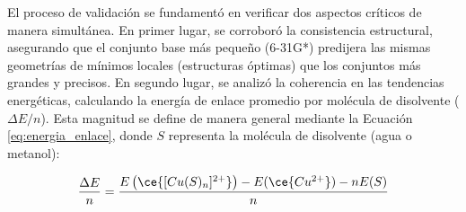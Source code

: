 El proceso de validación se fundamentó en verificar dos aspectos críticos de manera simultánea. En primer lugar, se corroboró la consistencia estructural, asegurando que el conjunto base más pequeño (6-31G*) predijera las mismas geometrías de mínimos locales (estructuras óptimas) que los conjuntos más grandes y precisos. En segundo lugar, se analizó la coherencia en las tendencias energéticas, calculando la energía de enlace promedio por molécula de disolvente ($\Delta E / n$). Esta magnitud se define de manera general mediante la Ecuación \ref{eq:energia_enlace}, donde $S$ representa la molécula de disolvente (agua o metanol):

\begin{equation}
    \frac{\Delta E}{n} = \frac{E\left(\ce{[Cu(S)_{n}]^{2+}}\right) - E(\ce{Cu^{2+}}) - n  E(S)}{n}\label{eq:energia_enlace}
\end{equation}



